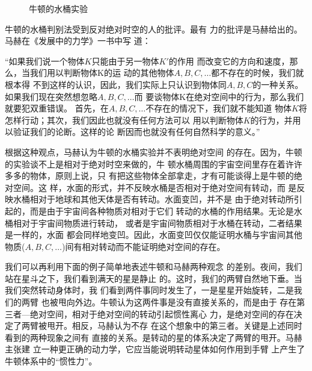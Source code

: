 \documentclass[../outline-of-mechanics.tex]{subfiles}
\begin{document}
\begin{figure}[h]
  \vspace{1em}
  \centering
  \qquad\qquad\qquad
  \caption{牛顿的水桶实验}
  \label{fig:12.11}
\end{figure}

\vspace{1em}
牛顿的水桶判别法受到反对绝对时空的人的批评。最有
力的批评是马赫给出的。马赫在《发展中的力学》一书中写
道：
\begin{quoting}
  “如果我们说一个物体$ K $只能由于另一物体$ K' $的作用
  而改变它的方向和速度，那么，当我们用以判断物体K的运
  动的其他物体$ A,B,C,\dots $都不存在的时候，我们就根本得
  不到这样的认识，因此，我们实际上只认识到物体同$ A,B,
    C $的一种关系。如果我们现在突然想忽略$ A,B,C,\dots $而
  要谈物体K在绝对空间中的行为，那么我们就要犯双重错误。
  首先，在$ A,B,C,\dots $不存在的情况下，我们就不能知道
  物体$ K $将怎样行动；其次，我们因此也就没有任何方法可以
  用以判断物体$ K $的行为，并用以验证我们的论断。这样的论
  断因而也就没有任何自然科学的意义。”
\end{quoting}

根据这种观点，马赫认为牛顿的水桶实验并不表明绝对空间
的存在。因为，牛顿的实验谈不上是相对于绝对时空来做的，牛
顿水桶周围的宇宙空间里存在着许许多多的物体，原则上说，只
有把这些物体全部拿走，才有可能谈得上是牛顿的绝对空间。这
样，水面的形式，并不反映水桶是否相对于绝对空间有转动，而
是反映水桶相对于地球和其他天体是否有转动。水面变凹，并不是
由于绝对转动所引起的，而是由于宇宙间各种物质对相对于它们
转动的水桶的作用结果。无论是水桶相对于宇宙间物质进行转动，
或者是宇宙间物质相对于水桶在转动，二者结果是一样的，水面
都会同样地变凹。因此，水面变凹仅仅能证明水桶与宇宙间其他
物质($ A,B,C,\dots $)间有相对转动而不能证明绝对空间的存在。

我们可以再利用下面的例子简单地表述牛顿和马赫两种观念
的差别。夜间，我们站在星斗之下，我们看到满天的星是静止
的。这时，我们的两臂自然地下垂。当我们突然转动身体时，我
们看到两件事同时发生了，一是星星开始旋转，二是我们的两臂
也被甩向外边。牛顿认为这两件事是没有直接关系的，而是由于
存在第三者—绝对空间，相对于绝对空间的转动引起惯性离心
力，是绝对空间的存在决定了两臂被甩开。相反，马赫认为不存
在这个想象中的第三者。关键是上述同时看到的两种现象之间有
直接的关系。是转动的星的体系决定了两臂的甩开。马赫主张建
立一种更正确的动力学，它应当能说明转动星体如何作用到手臂
上产生了牛顿体系中的“惯性力”。
\end{document}
